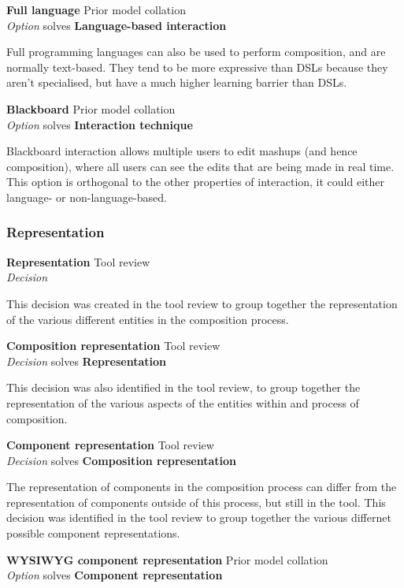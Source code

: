\textbf{Full language} \hfill Prior model collation \cite{Fischer2009,Pietschmann2010} \\ \emph{Option} \hfill solves \textbf{Language-based interaction}

Full programming languages can also be used to perform composition, and are normally text-based. They tend to be more expressive than DSLs because they aren't specialised, but have a much higher learning barrier than DSLs.

\textbf{Blackboard} \hfill Prior model collation \cite{Aghaee2012} \\ \emph{Option} \hfill solves \textbf{Interaction technique}

Blackboard interaction allows multiple users to edit mashups (and hence composition), where all users can see the edits that are being made in real time. This option is orthogonal to the other properties of interaction, it could either language- or non-language-based.

\subsubsection{Representation}

\textbf{Representation} \hfill Tool review \\ \emph{Decision} \hfill 

This decision was created in the tool review to group together the representation of the various different entities in the composition process.

\textbf{Composition representation} \hfill Tool review \\ \emph{Decision} \hfill solves \textbf{Representation}

This decision was also identified in the tool review, to group together the representation of the various aspects of the entities within and process of composition.

\textbf{Component representation} \hfill Tool review \\ \emph{Decision} \hfill solves \textbf{Composition representation}

The representation of components in the composition process can differ from the representation of components outside of this process, but still in the tool. This decision was identified in the tool review to group together the various differnet possible component representations.

\textbf{WYSIWYG component representation} \hfill Prior model collation \cite{Aghaee2012} \\ \emph{Option} \hfill solves \textbf{Component representation}

